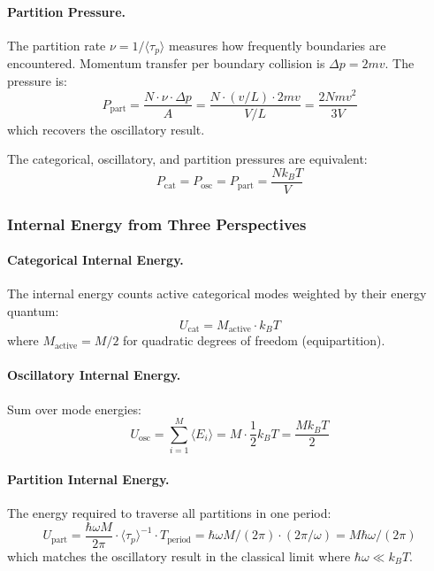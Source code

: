 \paragraph{Partition Pressure.}
The partition rate $\nu = 1/\langle\tau_p\rangle$ measures how frequently boundaries are encountered. Momentum transfer per boundary collision is $\Delta p = 2mv$. The pressure is:
\begin{equation}
P_{\text{part}} = \frac{N \cdot \nu \cdot \Delta p}{A} = \frac{N \cdot (v/L) \cdot 2mv}{V/L} = \frac{2Nmv^2}{3V}
\label{eq:partition_pressure}
\end{equation}
which recovers the oscillatory result.

\begin{proposition}
\label{prop:pressure_equivalence}
The categorical, oscillatory, and partition pressures are equivalent:
\begin{equation}
P_{\text{cat}} = P_{\text{osc}} = P_{\text{part}} = \frac{Nk_BT}{V}
\end{equation}
\end{proposition}

\subsubsection{Internal Energy from Three Perspectives}

\paragraph{Categorical Internal Energy.}
The internal energy counts active categorical modes weighted by their energy quantum:
\begin{equation}
U_{\text{cat}} = M_{\text{active}} \cdot k_B T
\label{eq:categorical_energy}
\end{equation}
where $M_{\text{active}} = M/2$ for quadratic degrees of freedom (equipartition).

\paragraph{Oscillatory Internal Energy.}
Sum over mode energies:
\begin{equation}
U_{\text{osc}} = \sum_{i=1}^{M} \langle E_i \rangle = M \cdot \frac{1}{2}k_B T = \frac{M k_B T}{2}
\label{eq:oscillatory_energy}
\end{equation}

\paragraph{Partition Internal Energy.}
The energy required to traverse all partitions in one period:
\begin{equation}
U_{\text{part}} = \frac{\hbar \omega M}{2\pi} \cdot \langle\tau_p\rangle^{-1} \cdot T_{\text{period}} = \hbar\omega M / (2\pi) \cdot (2\pi/\omega) = M\hbar\omega/(2\pi)
\label{eq:partition_energy}
\end{equation}
which matches the oscillatory result in the classical limit where $\hbar\omega \ll k_BT$.


